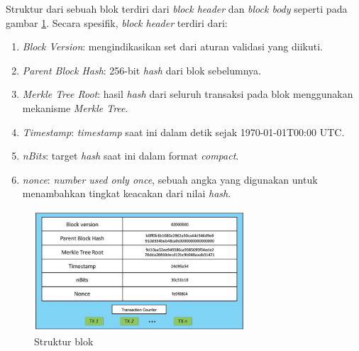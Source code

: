 \break

Struktur dari sebuah blok terdiri dari \textit{block header} dan \textit{block body} seperti pada gambar \ref{image:struktur-blok}. Secara spesifik, \textit{block header} terdiri dari:

\begin{enumerate}
	\item \textit{Block Version}: mengindikasikan set dari aturan validasi yang diikuti.
	\item \textit{Parent Block Hash}: 256-bit \textit{hash} dari blok sebelumnya.
	\item \textit{Merkle Tree Root}: hasil \textit{hash} dari seluruh transaksi pada blok menggunakan mekanisme \textit{Merkle Tree}.
	\item \textit{Timestamp}: \textit{timestamp} saat ini dalam detik sejak 1970-01-01T00:00 UTC.
	\item \textit{nBits}: target \textit{hash} saat ini dalam format \textit{compact}.
	\item \textit{nonce}: \textit{number used only once}, sebuah angka yang digunakan untuk menambahkan tingkat keacakan dari nilai \textit{hash}.
\end{enumerate}

\begin{figure}
	\centering
	\includegraphics[width=0.7\textwidth]{resources/chapter-2/struktur-block.png}
	\caption{Struktur blok \parencite{zheng2018blockchain}}
	\label{image:struktur-blok}
\end{figure}







